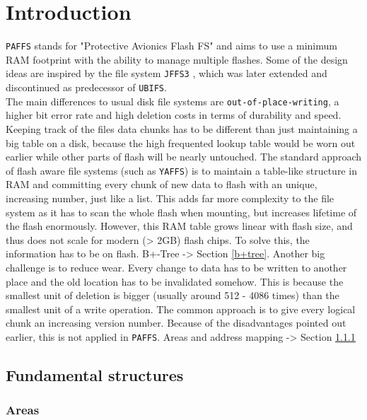 
\chapter{Introduction}
\label{cha:introduction}

\texttt{PAFFS} stands for "Protective Avionics Flash FS" and aims to use a minimum RAM footprint with the ability to manage multiple flashes. Some of the design ideas are inspired by the file system \texttt{JFFS3} , which was later extended  and discontinued as predecessor of \texttt{UBIFS}.\\
The main differences to usual disk file systems are \texttt{out-of-place-writing}, a higher bit error rate and high deletion costs in terms of durability and speed. Keeping track of the files data chunks has to be different than just maintaining a big table on a disk, because the high frequented lookup table would be worn out earlier while other parts of flash will be nearly untouched. The standard approach of flash aware file systems (such as \texttt{YAFFS}) is to maintain a table-like structure in RAM and committing every chunk of new data to flash with an unique, increasing number, just like a list. This adds far more complexity to the file system as it has to scan the whole flash when mounting, but increases lifetime of the flash enormously. However, this RAM table grows linear with flash size, and thus does not scale for modern (> 2GB) flash chips. To solve this, the information has to be on flash. B+-Tree -> Section \ref{b+tree}.
Another big challenge is to reduce wear. Every change to data has to be written to another place and the old location has to be invalidated somehow. This is because the smallest unit of deletion is bigger (usually around 512 - 4086 times) than the smallest unit of a write operation. The common approach is to give every logical chunk an increasing version number. Because of the disadvantages pointed out earlier, this is not applied in \texttt{PAFFS}. Areas and address mapping -> Section \ref{areas}

\section{Fundamental structures}
\label{sec:funst}


\subsection{Areas}
\label{areas}
